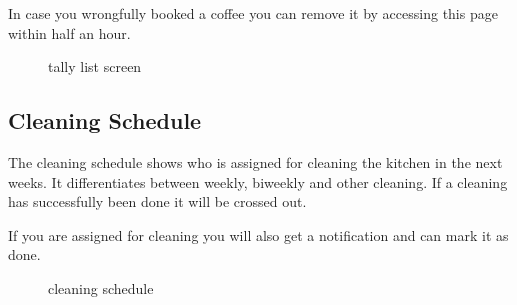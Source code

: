 In case you wrongfully booked a coffee you can remove it by accessing
this page within half an hour.

\begin{figure}[htbp]
\centering
{}
\caption{tally list screen}
\end{figure}

\subsection{Cleaning Schedule}\label{cleaning-schedule-1}

The cleaning schedule shows who is assigned for cleaning the kitchen in
the next weeks. It differentiates between weekly, biweekly and other
cleaning. If a cleaning has successfully been done it will be crossed
out.

If you are assigned for cleaning you will also get a notification and
can mark it as done.

\begin{figure}[htbp]
\centering
{}
\caption{cleaning schedule}
\end{figure}

